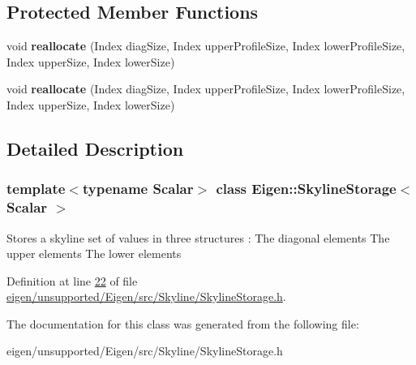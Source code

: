 \subsection*{Protected Member Functions}
\begin{DoxyCompactItemize}
\item 
\mbox{\label{class_eigen_1_1_skyline_storage_adbd0f2125fc8ac1a85fc2740835b9bbe}} 
void {\bfseries reallocate} (Index diag\+Size, Index upper\+Profile\+Size, Index lower\+Profile\+Size, Index upper\+Size, Index lower\+Size)
\item 
\mbox{\label{class_eigen_1_1_skyline_storage_adbd0f2125fc8ac1a85fc2740835b9bbe}} 
void {\bfseries reallocate} (Index diag\+Size, Index upper\+Profile\+Size, Index lower\+Profile\+Size, Index upper\+Size, Index lower\+Size)
\end{DoxyCompactItemize}


\subsection{Detailed Description}
\subsubsection*{template$<$typename Scalar$>$\newline
class Eigen\+::\+Skyline\+Storage$<$ Scalar $>$}

Stores a skyline set of values in three structures \+: The diagonal elements The upper elements The lower elements 

Definition at line \hyperlink{eigen_2unsupported_2_eigen_2src_2_skyline_2_skyline_storage_8h_source_l00022}{22} of file \hyperlink{eigen_2unsupported_2_eigen_2src_2_skyline_2_skyline_storage_8h_source}{eigen/unsupported/\+Eigen/src/\+Skyline/\+Skyline\+Storage.\+h}.



The documentation for this class was generated from the following file\+:\begin{DoxyCompactItemize}
\item 
eigen/unsupported/\+Eigen/src/\+Skyline/\+Skyline\+Storage.\+h\end{DoxyCompactItemize}
